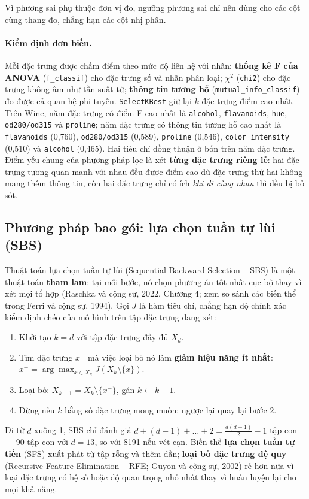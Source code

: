 \noindent Vì phương sai phụ thuộc đơn vị đo, ngưỡng phương sai chỉ nên dùng cho các cột cùng thang đo, chẳng hạn các cột nhị phân.

\paragraph{Kiểm định đơn biến.} Mỗi đặc trưng được chấm điểm theo mức độ liên hệ với nhãn: \textbf{thống kê F của ANOVA} (\texttt{f\_classif}) cho đặc trưng số và nhãn phân loại; \textbf{$\chi^2$} (\texttt{chi2}) cho đặc trưng không âm như tần suất từ; \textbf{thông tin tương hỗ} (\texttt{mutual\_info\_classif}) đo được cả quan hệ phi tuyến. \texttt{SelectKBest} giữ lại $k$ đặc trưng điểm cao nhất. Trên Wine, năm đặc trưng có điểm F cao nhất là \texttt{alcohol}, \texttt{flavanoids}, \texttt{hue}, \texttt{od280/od315} và \texttt{proline}; năm đặc trưng có thông tin tương hỗ cao nhất là \texttt{flavanoids} (0,760), \texttt{od280/od315} (0,589), \texttt{proline} (0,546), \texttt{color\_intensity} (0,510) và \texttt{alcohol} (0,465). Hai tiêu chí đồng thuận ở bốn trên năm đặc trưng. Điểm yếu chung của phương pháp lọc là xét \textbf{từng đặc trưng riêng lẻ}: hai đặc trưng tương quan mạnh với nhau đều được điểm cao dù đặc trưng thứ hai không mang thêm thông tin, còn hai đặc trưng chỉ có ích \textit{khi đi cùng nhau} thì đều bị bỏ sót.

\subsection{Phương pháp bao gói: lựa chọn tuần tự lùi (SBS)}

Thuật toán lựa chọn tuần tự lùi (Sequential Backward Selection -- SBS) là một thuật toán \textbf{tham lam}: tại mỗi bước, nó chọn phương án tốt nhất cục bộ thay vì xét mọi tổ hợp (Raschka và cộng sự, 2022, Chương 4; xem so sánh các biến thể trong Ferri và cộng sự, 1994). Gọi $J$ là hàm tiêu chí, chẳng hạn độ chính xác kiểm định chéo của mô hình trên tập đặc trưng đang xét:
\begin{enumerate}
    \item Khởi tạo $k = d$ với tập đặc trưng đầy đủ $X_d$.
    \item Tìm đặc trưng $x^{-}$ mà việc loại bỏ nó làm \textbf{giảm hiệu năng ít nhất}: $x^{-} = \arg\max_{x \in X_k} J(X_k \setminus \{x\})$.
    \item Loại bỏ: $X_{k-1} = X_k \setminus \{x^{-}\}$, gán $k \leftarrow k - 1$.
    \item Dừng nếu $k$ bằng số đặc trưng mong muốn; ngược lại quay lại bước 2.
\end{enumerate}
Đi từ $d$ xuống 1, SBS chỉ đánh giá $d + (d - 1) + \dots + 2 = \frac{d(d+1)}{2} - 1$ tập con --- 90 tập con với $d = 13$, so với 8191 nếu vét cạn. Biến thể \textbf{lựa chọn tuần tự tiến} (SFS) xuất phát từ tập rỗng và thêm dần; \textbf{loại bỏ đặc trưng đệ quy} (Recursive Feature Elimination -- RFE; Guyon và cộng sự, 2002) rẻ hơn nữa vì loại đặc trưng có hệ số hoặc độ quan trọng nhỏ nhất thay vì huấn luyện lại cho mọi khả năng.

